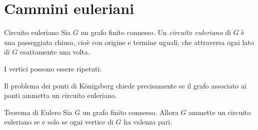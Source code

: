 \documentclass[a4paper]{article}
\begin{document}
\section{Cammini euleriani}

\begin{snippetdefinition}{Circuito euleriano}
    Sia \(G\) un grafo finito connesso. Un \emph{circuito euleriano} di \(G\) è una passeggiata chiusa, cioè con origine e termine uguali, che attraversa ogni lato di \(G\) esattamente una volta.

    I vertici possono essere ripetuti.
\end{snippetdefinition}

Il problema dei ponti di Königsberg chiede precisamente se il grafo associato ai ponti ammetta un circuito euleriano.

\begin{snippettheorem}{Teorema di Eulero}
    Sia \(G\) un grafo finito connesso. Allora \(G\) ammette un circuito euleriano se e solo se ogni vertice di \(G\) ha valenza pari.
\end{snippettheorem}
\end{document}
